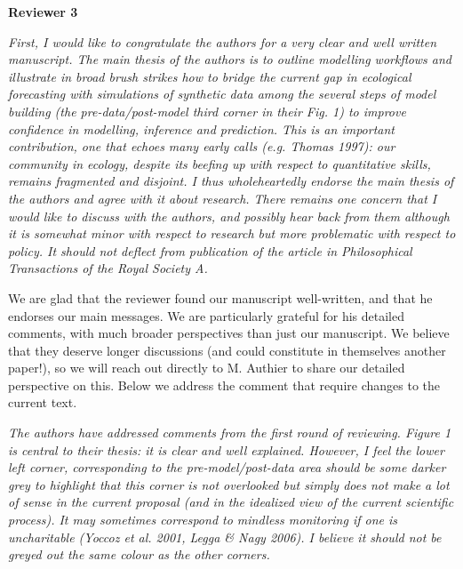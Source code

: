 \documentclass[11pt,letter]{article}
\begin{document}
{\bf Reviewer 3} %

\begin{mybox}
\emph{First, I would like to congratulate the authors for a very clear and well written manuscript. The main thesis of the authors is to outline modelling workflows and illustrate in broad brush strikes how to bridge the current gap in ecological forecasting with simulations of synthetic data among the several steps of model building (the pre-data/post-model third corner in their Fig. 1) to improve confidence in modelling, inference and prediction. This is an important contribution, one that echoes many early calls (e.g. Thomas 1997): our community in ecology, despite its beefing up with respect to quantitative skills, remains fragmented and disjoint. I thus wholeheartedly endorse the main thesis of the authors and agree with it about research. There remains one concern that I would like to discuss with the authors, and possibly hear back from them although it is somewhat minor with respect to research but more problematic with respect to policy. It should not deflect from publication of the article in Philosophical Transactions of the Royal Society A.}
\end{mybox}

We are glad that the reviewer found our manuscript well-written, and that he endorses our main messages. We are particularly grateful for his detailed comments, with much broader perspectives than just our manuscript. We believe that they deserve longer discussions (and could constitute in themselves another paper!), so we will reach out directly to M. Authier to share our detailed perspective on this. Below we address the comment that require changes to the current text.

\begin{mybox}
\emph{The authors have addressed comments from the first round of reviewing. Figure 1 is central to their thesis: it is clear and well explained. However, I feel the lower left corner, corresponding to the pre-model/post-data area should be some darker grey to highlight that this corner is not overlooked but simply does not make a lot of sense in the current proposal (and in the idealized view of the current scientific process). It may sometimes correspond to mindless monitoring if one is uncharitable (Yoccoz et al. 2001, Legga \& Nagy 2006). I believe it should not be greyed out the same colour as the other corners.}  
\end{mybox}
\end{document}
